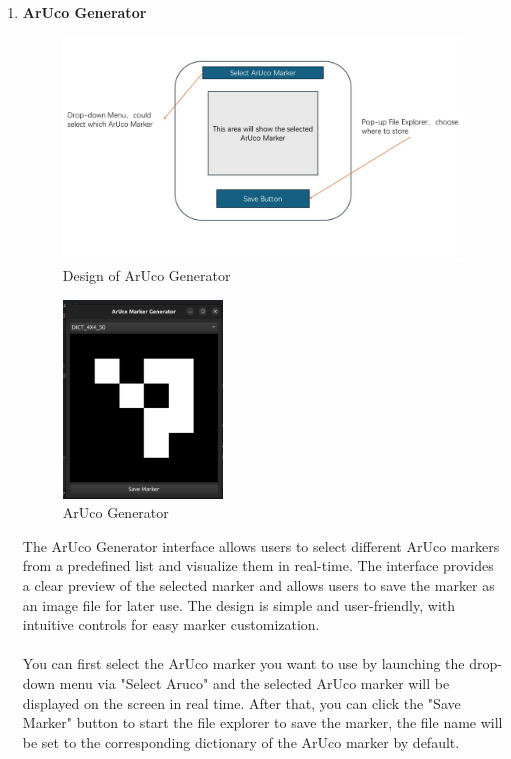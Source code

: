 \documentclass[12pt]{article}
\begin{document}
\begin{enumerate}
\begin{enumerate}
                  \item \textbf{ArUco Generator}
                        \begin{figure}[H]
                              \centering
                              \includegraphics[width=1.2\textwidth]{design_generator.jpg}
                              \caption{Design of ArUco Generator}
                        \end{figure}
                        \begin{figure}[H]
                              \centering
                              \includegraphics[width=0.4\textwidth]{main_arucuo.png}
                              \caption{ArUco Generator}
                        \end{figure}
                        The ArUco Generator interface allows users to select different ArUco markers from a predefined list and visualize them in real-time.
                        The interface provides a clear preview of the selected marker and allows users to save the marker as an image file for later use.
                        The design is simple and user-friendly, with intuitive controls for easy marker customization.
                        \\\\
                        You can first select the ArUco marker you want to use by launching the drop-down menu via "Select Aruco" and the selected ArUco marker will be displayed on the screen in real time. After that, you can click the "Save Marker" button to start the file explorer to save the marker, the file name will be set to the corresponding dictionary of the ArUco marker by default.
            \end{enumerate}



\end{enumerate}
\end{document}
